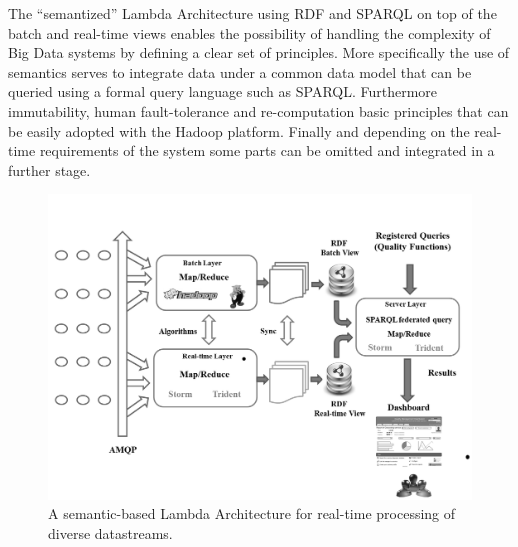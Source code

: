 The ``semantized'' Lambda Architecture using RDF and SPARQL on top of the batch and real-time views enables 
the possibility of handling the complexity of Big Data systems by defining a clear set of principles. More specifically 
the use of semantics serves to integrate data under a common data model that can be queried using a formal 
query language such as SPARQL. Furthermore immutability, human fault-tolerance and re-computation basic principles 
that can be easily adopted with the Hadoop platform. Finally and depending on the real-time requirements of 
the system some parts can be omitted and integrated in a further stage.

\begin{figure}[!ht]
\centering
	\includegraphics[width=12cm]{./imgs/lambda-qos}
 \caption{A semantic-based Lambda Architecture for real-time processing of diverse datastreams.}
 \label{fig:lambda-qos}
\end{figure}







